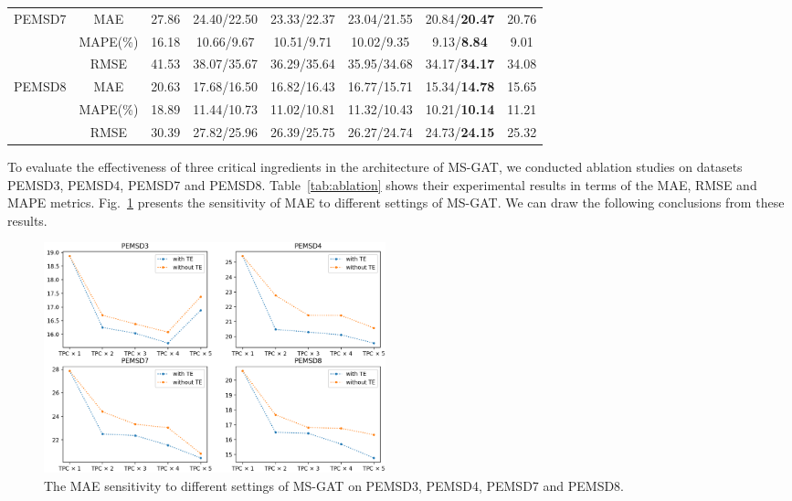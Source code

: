 \begin{table}[!htb]
\begin{tabular}{cccccccc}
        \hline
        \multicolumn{1}{c|}{\multirow{3}{*}{PEMSD7}} & \multicolumn{1}{c|}{MAE}      & 27.86 & 24.40/22.50 & 23.33/22.37 & 23.04/21.55          & 20.84/\textbf{20.47} & 20.76 \\
        \multicolumn{1}{c|}{}                        & \multicolumn{1}{c|}{MAPE(\%)} & 16.18 & 10.66/9.67  & 10.51/9.71  & 10.02/9.35           & 9.13/\textbf{8.84}   & 9.01 \\
        \multicolumn{1}{c|}{}                        & \multicolumn{1}{c|}{RMSE}     & 41.53 & 38.07/35.67 & 36.29/35.64 & 35.95/34.68          & 34.17/\textbf{34.17} & 34.08 \\
        \hline
        \multicolumn{1}{c|}{\multirow{3}{*}{PEMSD8}} & \multicolumn{1}{c|}{MAE}      & 20.63 & 17.68/16.50 & 16.82/16.43 & 16.77/15.71          & 15.34/\textbf{14.78} & 15.65 \\
        \multicolumn{1}{c|}{}                        & \multicolumn{1}{c|}{MAPE(\%)} & 18.89 & 11.44/10.73 & 11.02/10.81 & 11.32/10.43          & 10.21/\textbf{10.14} & 11.21 \\
        \multicolumn{1}{c|}{}                        & \multicolumn{1}{c|}{RMSE}     & 30.39 & 27.82/25.96 & 26.39/25.75 & 26.27/24.74          & 24.73/\textbf{24.15} & 25.32 \\
        \bottomrule[2pt]
    \end{tabular}
\end{table}

To evaluate the effectiveness of three critical ingredients in the architecture of MS-GAT, we conducted ablation studies on datasets PEMSD3, PEMSD4, PEMSD7 and PEMSD8. Table~\ref{tab:ablation} shows their experimental results in terms of the MAE, RMSE and MAPE metrics. Fig.~\ref{fig:ablation} presents the sensitivity of MAE to different settings of MS-GAT. We can draw the following conclusions from these results.

\begin{figure}[!ht]
    \centering
    \includegraphics[width=0.48\textwidth]{pictures/Ablation.png}
    \caption{The MAE sensitivity to different settings of MS-GAT on PEMSD3, PEMSD4, PEMSD7 and PEMSD8.}
    \label{fig:ablation}
\end{figure}

